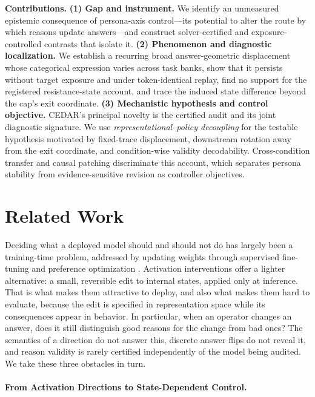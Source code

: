 \documentclass[letterpaper]{article} %
\begin{document}
\noindent\textbf{Contributions.}
\textbf{(1) Gap and instrument.} We identify an unmeasured epistemic consequence of persona-axis control---its potential to alter the route by which reasons update answers---and construct solver-certified and exposure-controlled contrasts that isolate it.
\textbf{(2) Phenomenon and diagnostic localization.} We establish a recurring broad answer-geometric displacement whose categorical expression varies across task banks, show that it persists without target exposure and under token-identical replay, find no support for the registered resistance-state account, and trace the induced state difference beyond the cap's exit coordinate.
\textbf{(3) Mechanistic hypothesis and control objective.} CEDAR's principal novelty is the certified audit and its joint diagnostic signature. We use \emph{representational--policy decoupling} for the testable hypothesis motivated by fixed-trace displacement, downstream rotation away from the exit coordinate, and condition-wise validity decodability. Cross-condition transfer and causal patching discriminate this account, which separates persona stability from evidence-sensitive revision as controller objectives.

\section{Related Work}
\label{sec:background}

Deciding what a deployed model should and should not do has largely been a training-time problem, addressed by updating weights through supervised fine-tuning and preference optimization \citep{ouyang2022training,rafailov2023direct}. Activation interventions offer a lighter alternative: a small, reversible edit to internal states, applied only at inference. That is what makes them attractive to deploy, and also what makes them hard to evaluate, because the edit is specified in representation space while its consequences appear in behavior. In particular, when an operator changes an answer, does it still distinguish good reasons for the change from bad ones? The semantics of a direction do not answer this, discrete answer flips do not reveal it, and reason validity is rarely certified independently of the model being audited. We take these three obstacles in turn.

\paragraph{From Activation Directions to State-Dependent Control.}
\end{document}
